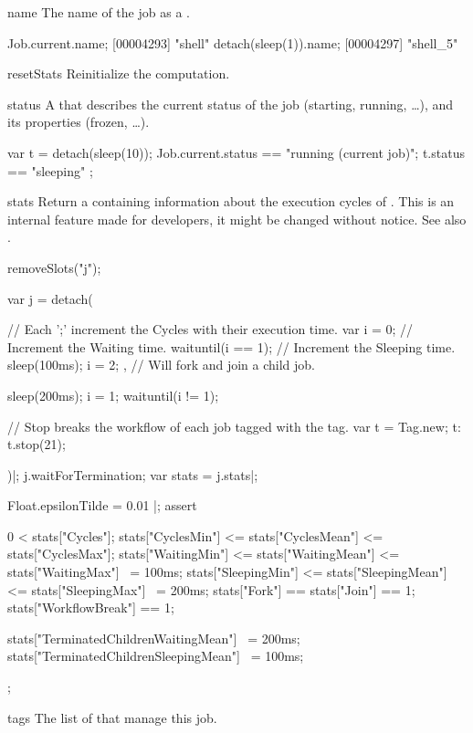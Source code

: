 \begin{urbiscriptapi}
\item[name] The name of the job as a .
\begin{urbiscript}
Job.current.name;
[00004293] "shell"
detach(sleep(1)).name;
[00004297] "shell_5"
\end{urbiscript}

\item[resetStats]%
  Reinitialize the  computation.


\item[status] A  that describes the current status of the
  job (starting, running, \ldots), and its properties (frozen, \ldots).
\begin{urbiassert}
var t = detach(sleep(10));
Job.current.status == "running (current job)";
t.status == "sleeping" ;
\end{urbiassert}

\item[stats]%
  Return a  containing information about the execution
  cycles of \urbi.  This is an internal feature made for developers, it
  might be changed without notice.  See also .
\begin{urbicomment}
removeSlots("j");
\end{urbicomment}
\begin{urbiscript}
var j = detach({
  // Each ';' increment the Cycles with their execution time.
  var i = 0;
  {
    // Increment the Waiting time.
    waituntil(i == 1);
    // Increment the Sleeping time.
    sleep(100ms);
    i = 2;
  }, // Will fork and join a child job.

  sleep(200ms);
  i = 1;
  waituntil(i != 1);

  // Stop breaks the workflow of each job tagged with the tag.
  var t = Tag.new;
  t: t.stop(21);
})|;
j.waitForTermination;
var stats = j.stats|;

Float.epsilonTilde = 0.01 |;
assert
{
  0 < stats["Cycles"];
  stats["CyclesMin"] <= stats["CyclesMean"] <= stats["CyclesMax"];
  stats["WaitingMin"] <= stats["WaitingMean"] <= stats["WaitingMax"] ~= 100ms;
  stats["SleepingMin"] <= stats["SleepingMean"] <= stats["SleepingMax"] ~= 200ms;
  stats["Fork"] == stats["Join"] == 1;
  stats["WorkflowBreak"] == 1;

  stats["TerminatedChildrenWaitingMean"] ~= 200ms;
  stats["TerminatedChildrenSleepingMean"] ~= 100ms;
};
\end{urbiscript}


\item[tags] The list of  that manage this job.


\end{urbiscriptapi}
